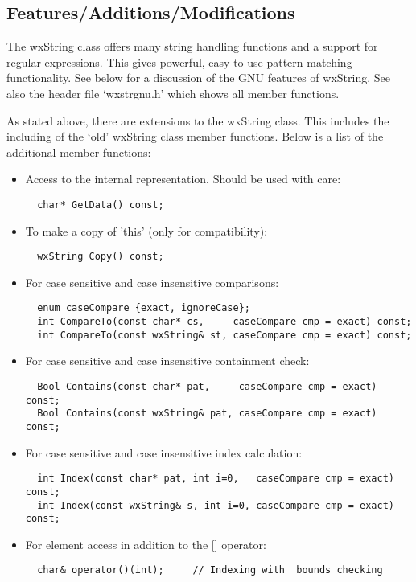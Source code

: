 \subsection{Features/Additions/Modifications}

The wxString class offers many string handling functions and a support for
regular expressions. This gives powerful, easy-to-use pattern-matching functionality.
See below for a discussion of the GNU features of wxString. See also 
the header file `wxstrgnu.h' which shows all member functions.

As stated above, there are extensions to the wxString class.
This includes the including of the `old' wxString class member functions.
Below is a list of the additional member functions:

\begin{itemize}\itemsep=0pt
\item Access to the internal representation. Should be used with care:
\begin{verbatim}
  char* GetData() const;
\end{verbatim}
\item To make a copy of 'this' (only for compatibility):
\begin{verbatim}
  wxString Copy() const;
\end{verbatim}
\item For case sensitive and case insensitive comparisons:
\begin{verbatim}
  enum caseCompare {exact, ignoreCase};
  int CompareTo(const char* cs,     caseCompare cmp = exact) const;
  int CompareTo(const wxString& st, caseCompare cmp = exact) const;
\end{verbatim}

\item For case sensitive and case insensitive containment check:
\begin{verbatim}
  Bool Contains(const char* pat,     caseCompare cmp = exact) const;
  Bool Contains(const wxString& pat, caseCompare cmp = exact) const;
\end{verbatim}

\item For case sensitive and case insensitive index calculation:
\begin{verbatim}
  int Index(const char* pat, int i=0,   caseCompare cmp = exact) const;
  int Index(const wxString& s, int i=0, caseCompare cmp = exact) const;
\end{verbatim}
  
\item For element access in addition to the [] operator:
\begin{verbatim}
  char& operator()(int);     // Indexing with  bounds checking
\end{verbatim}


\end{itemize}
